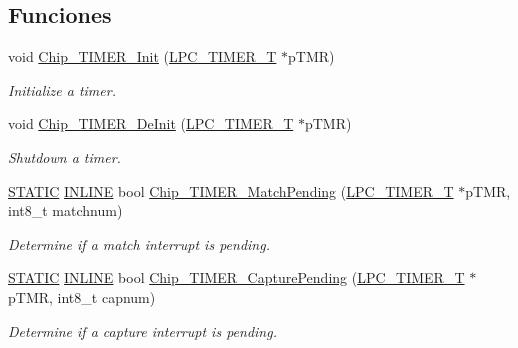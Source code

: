 \subsection*{Funciones}
\begin{DoxyCompactItemize}
\item 
void \hyperlink{group___t_i_m_e_r__18_x_x__43_x_x_gac2ca0aff00ae8a651e129afba400c833}{Chip\+\_\+\+T\+I\+M\+E\+R\+\_\+\+Init} (\hyperlink{struct_l_p_c___t_i_m_e_r___t}{L\+P\+C\+\_\+\+T\+I\+M\+E\+R\+\_\+T} $\ast$p\+T\+MR)
\begin{DoxyCompactList}\small\item\em Initialize a timer. \end{DoxyCompactList}\item 
void \hyperlink{group___t_i_m_e_r__18_x_x__43_x_x_gaa52f3e33303d7d4f1e2325586a21a5c0}{Chip\+\_\+\+T\+I\+M\+E\+R\+\_\+\+De\+Init} (\hyperlink{struct_l_p_c___t_i_m_e_r___t}{L\+P\+C\+\_\+\+T\+I\+M\+E\+R\+\_\+T} $\ast$p\+T\+MR)
\begin{DoxyCompactList}\small\item\em Shutdown a timer. \end{DoxyCompactList}\item 
\hyperlink{group___l_p_c___types___public___macros_ga10b2d890d871e1489bb02b7e70d9bdfb}{S\+T\+A\+T\+IC} \hyperlink{spifi__18xx__43xx_8h_a2eb6f9e0395b47b8d5e3eeae4fe0c116}{I\+N\+L\+I\+NE} bool \hyperlink{group___t_i_m_e_r__18_x_x__43_x_x_ga0d61fd61d18ba82d44f1b5fec2e48a76}{Chip\+\_\+\+T\+I\+M\+E\+R\+\_\+\+Match\+Pending} (\hyperlink{struct_l_p_c___t_i_m_e_r___t}{L\+P\+C\+\_\+\+T\+I\+M\+E\+R\+\_\+T} $\ast$p\+T\+MR, int8\+\_\+t matchnum)
\begin{DoxyCompactList}\small\item\em Determine if a match interrupt is pending. \end{DoxyCompactList}\item 
\hyperlink{group___l_p_c___types___public___macros_ga10b2d890d871e1489bb02b7e70d9bdfb}{S\+T\+A\+T\+IC} \hyperlink{spifi__18xx__43xx_8h_a2eb6f9e0395b47b8d5e3eeae4fe0c116}{I\+N\+L\+I\+NE} bool \hyperlink{group___t_i_m_e_r__18_x_x__43_x_x_gae9a2575f38b3acaf6255caf15c5b65df}{Chip\+\_\+\+T\+I\+M\+E\+R\+\_\+\+Capture\+Pending} (\hyperlink{struct_l_p_c___t_i_m_e_r___t}{L\+P\+C\+\_\+\+T\+I\+M\+E\+R\+\_\+T} $\ast$p\+T\+MR, int8\+\_\+t capnum)
\begin{DoxyCompactList}\small\item\em Determine if a capture interrupt is pending. \end{DoxyCompactList}\item 

\end{DoxyCompactItemize}
